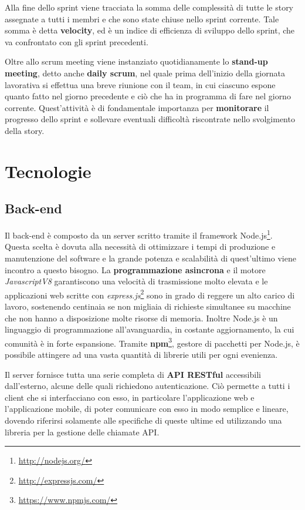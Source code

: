 Alla fine dello sprint viene tracciata la somma delle complessità di tutte le story assegnate a tutti i membri e che sono state chiuse nello sprint corrente. Tale somma è detta \textbf{velocity}, ed è un indice di efficienza di sviluppo dello sprint, che va confrontato con gli sprint precedenti.

Oltre allo scrum meeting viene instanziato quotidianamente lo \textbf{stand-up meeting}, detto anche \textbf{daily scrum}, nel quale prima dell'inizio della giornata lavorativa si effettua una breve riunione con il team, in cui ciascuno espone quanto fatto nel giorno precedente e ciò che ha in programma di fare nel giorno corrente. Quest'attività è di fondamentale importanza per \textbf{monitorare} il progresso dello sprint e sollevare eventuali difficoltà riscontrate nello svolgimento della story. 

\section{Tecnologie}

\subsection{Back-end}

Il back-end è composto da un server scritto tramite il framework \gls{Node.js}\footnote{\url{http://nodejs.org/}}. Questa scelta è dovuta alla necessità di ottimizzare i tempi di produzione e manutenzione del software e la grande potenza e scalabilità di quest'ultimo viene incontro a questo bisogno. La \textbf{programmazione asincrona} e il motore \textit{JavascriptV8} garantiscono una velocità di trasmissione molto elevata e le applicazioni web scritte con \textit{express.js}\footnote{\url{http://expressjs.com/}} sono in grado di reggere un alto carico di lavoro, sostenendo centinaia se non migliaia di richieste simultanee su macchine che non hanno a disposizione molte risorse di memoria. Inoltre Node.js è un linguaggio di programmazione all'avanguardia, in costante aggiornamento, la cui comunità è in forte espansione. Tramite \textbf{npm}\footnote{\url{https://www.npmjs.com/}}, gestore di pacchetti per Node.js, è possibile attingere ad una vasta quantità di librerie utili per ogni evenienza.

Il server fornisce tutta una serie completa di \textbf{\gls{API} \gls{REST}ful} accessibili dall'esterno, alcune delle quali richiedono autenticazione. Ciò permette a tutti i client che si interfacciano con esso, in particolare l'applicazione web e l'applicazione mobile, di poter comunicare con esso in modo semplice e lineare, dovendo riferirsi solamente alle specifiche di queste ultime ed utilizzando una libreria per la gestione delle chiamate API. 

